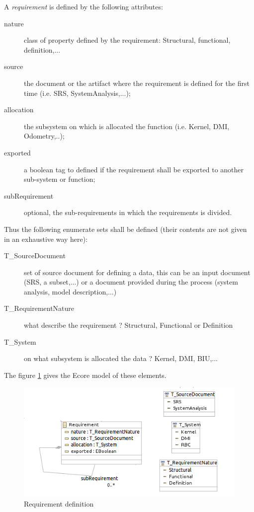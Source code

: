 A \textit{requirement} is defined by the following attributes:
\begin{description}
\item[nature] class of property defined by the requirement: Structural, functional, definition,...
\item[source] the document or the artifact where the requirement is defined for the first time (i.e. SRS, SystemAnalysis,...);
\item[allocation] the subsystem  on which is allocated the function (i.e. Kernel, DMI, Odometry,..);
\item[exported] a boolean tag to defined if the requirement shall be exported to another sub-system or function;
\item[subRequirement] optional, the sub-requirements in which the requirements is divided.
\end{description}

Thus the following enumerate sets shall be defined (their contents are not given in an exhaustive way here):
\begin{description}

\item[T\_SourceDocument] set of source document for defining a data, this can be an input document (SRS, a subset,...) or a document provided during the process (system analysis, model description,...) 
\item[T\_RequirementNature] what describe the requirement ? Structural, Functional or Definition
\item[T\_System] on what subsystem is allocated the data ? Kernel, DMI, BIU,...
\end{description}

The figure \ref{fig:requirement} gives the Ecore model of these elements.

\begin{figure}[ht]
  \centering
  \includegraphics{DataModel/Requirement1.png}
  \caption{Requirement definition}
  \label{fig:requirement}
\end{figure}


